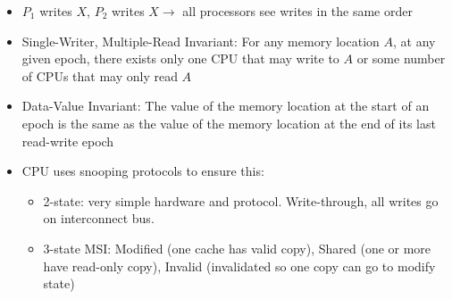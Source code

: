 \documentclass[landscape,10pt]{article}
\begin{document}
\begin{multicols}{4}
\begin{itemize}
\begin{itemize}
        \item[] \(P_1\) writes \(X\), \(P_2\) writes \(X \rightarrow\) all processors see writes in the same order
        \item[] Single-Writer, Multiple-Read Invariant: For any memory location \(A\), at any given epoch, there exists only one CPU that may write to \(A\) or some number of CPUs that may only read \(A\)
        \item[] Data-Value Invariant: The value of the memory location at the start of an epoch is the same as the value of the memory location at the end of its last read-write epoch
        \item[] CPU uses snooping protocols to ensure this:
        \begin{itemize}
            \item[] 2-state: very simple hardware and protocol. Write-through, all writes go on interconnect bus.
            \item[] 3-state MSI: Modified (one cache has valid copy), Shared (one or more have read-only copy), Invalid (invalidated so one copy can go to modify state)
        \end{itemize}

    \end{itemize}
\end{itemize}


\end{multicols}
\end{document}
